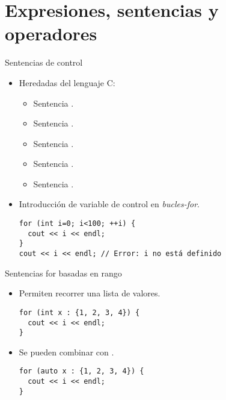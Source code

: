 \section{Expresiones, sentencias y operadores}

\begin{frame}[t,fragile]{Sentencias de control}
\begin{itemize}
  \item Heredadas del lenguaje C:
    \begin{itemize}
      \item Sentencia .
      \item Sentencia .
      \item Sentencia .
      \item Sentencia .
      \item Sentencia .
    \end{itemize}
  \item Introducción de variable de control en \emph{bucles-for}.
\begin{lstlisting}
for (int i=0; i<100; ++i) {
  cout << i << endl;
}
cout << i << endl; // Error: i no está definido
\end{lstlisting}
\end{itemize}
\end{frame}

\begin{frame}[t,fragile]{Sentencias for basadas en rango}
\begin{itemize}
  \item Permiten recorrer una lista de valores.
\begin{lstlisting}
for (int x : {1, 2, 3, 4}) {
  cout << i << endl;
}
\end{lstlisting}
  \item Se pueden combinar con .
\begin{lstlisting}
for (auto x : {1, 2, 3, 4}) {
  cout << i << endl;
}
\end{lstlisting}

\end{itemize}
\end{frame}
